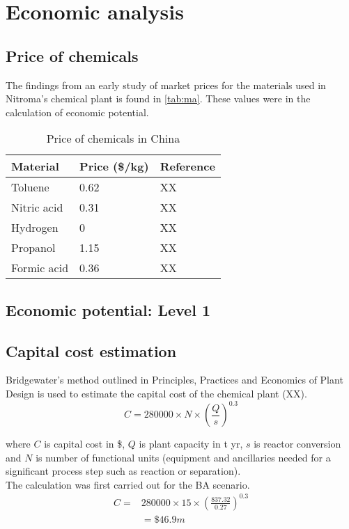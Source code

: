 \section{Economic analysis}
\label{app:economics}
\subsection{Price of chemicals}

The findings from an early study of market prices for the materials used in Nitroma's chemical plant is found in \cref{tab:ma}. These values were in the calculation of economic potential.

\begin{table}[h] %
\centering
\caption{Price of chemicals in China}
\label{material-prices}
\begin{tabular}{lll}
    \toprule
    Material    & Price (\$/kg) & Reference \\ \midrule
    Toluene     & 0.62          & XX        \\
    Nitric acid & 0.31          & XX        \\
    Hydrogen    & 0             & XX        \\
    Propanol    & 1.15          & XX        \\
    Formic acid & 0.36          & XX        \\ \bottomrule
\end{tabular}
\end{table}

\subsection{Economic potential: Level 1}

\subsection{Capital cost estimation}

Bridgewater's method outlined in Principles, Practices and Economics of Plant Design is used to estimate the capital cost of the chemical plant (XX).
\begin{equation}
    C=280000 \times N \times \left(\frac{Q}{s}\right)^{0.3}
\end{equation}

\noindent where $C$ is capital cost in \$, $Q$ is  plant capacity in t yr, $s$ is reactor conversion and $N$ is number of functional units (equipment and ancillaries needed for a significant process step such as reaction or separation).\\
The calculation was first carried out for the BA scenario.
\begin{equation}
\begin{split} 
C=& 280000 \times 15 \times \left(\frac{837.32}{0.27}\right)^{0.3}  \\
 & =\$46.9m 
\end{split}
\end{equation}
    
